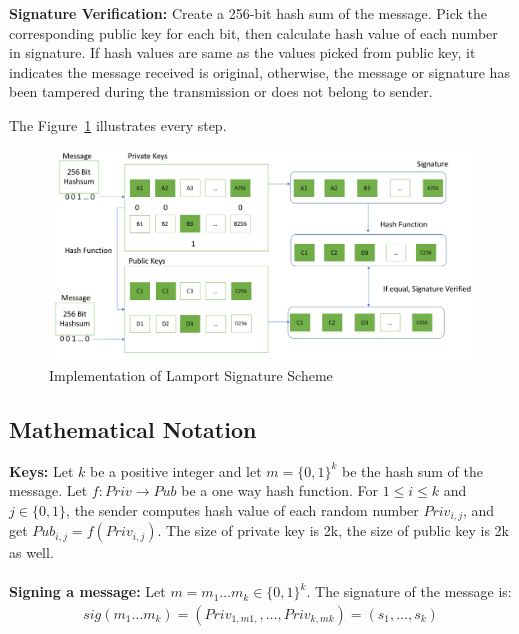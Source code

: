 \documentclass[10pt,sigconf]{acmart}
\begin{document}
\noindent\textbf{Signature Verification:} \quad Create a 256-bit hash sum of the message. Pick the corresponding public key for each bit, then calculate hash value of each number in signature. If hash values are same as the values picked from public key, it indicates the message received is original, otherwise, the message or signature has been tampered during the transmission or does not belong to sender. 
\vspace{0.5em}

\noindent The Figure~\ref{fig:Lamport_Implementation_Details} illustrates every step.

\begin{figure}[H]
\centering
\includegraphics[scale=0.18]{Lamport_Implementation_Details.png}
\caption{\small{Implementation of Lamport Signature Scheme}}
\label{fig:Lamport_Implementation_Details}
\end{figure}


\subsection{Mathematical Notation}

\textbf{Keys:} \quad Let $k$ be a positive integer and let $m = \{0,1\}^k$ be the hash sum of the message. Let $f:Priv \to Pub$ be a one way hash function. For $1 \leq i \leq k$ and $j \in \{0,1\}$, the sender computes hash value of each random number $Priv_{i,j}$, and get $Pub_{i,j} = f (Priv_{i,j})$. The size of private key is 2k, the size of public key is 2k as well.
\\
\\
\noindent \textbf{Signing a message:} \quad Let $m = m_1 \dots m_k \in \{0,1\}^k$. The signature of the message is:
\begin{align*}
sig(m_1 \dots m_k) = (Priv_{1,m1,}, \dots , Priv_{k,mk}) = (s_1, \dots, s_k)    
\end{align*}
\end{document}
